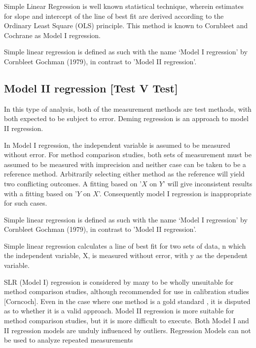 \documentclass[12pt, a4paper]{report}
\theoremstyle{plain}
\theoremstyle{definition}
\theoremstyle{remark}
\begin{document}
Simple Linear Regression is well known statistical technique, wherein estimates for slope and
intercept of the line of best fit are derived according to the Ordinary Least Square (OLS) principle. This method is known to Cornbleet and Cochrane as Model I regression.

Simple linear regression is defined as such with the name `Model I regression' by Cornbleet Gochman (1979), in contrast to 'Model II regression'.

 
\subsection{Model II regression [Test V Test]}
In this type of analysis, both of the measurement methods are test methods, with both expected to be subject to error. Deming regression is an approach to model II regression.



In Model I regression, the independent variable is assumed to be
measured without error. For method comparison studies, both sets of measurement must be assumed to be measured with imprecision and neither case can be taken to be a reference method. Arbitrarily
selecting either method as the reference will yield two conflicting outcomes. A fitting based on '$X$ on $Y$' will give inconsistent results with a fitting based on '$Y$ on $X$'. Consequently model I regression is inappropriate for such cases.



 Simple linear regression is defined as such with the name `Model I regression' by Cornbleet Gochman (1979), in contrast to 'Model II regression'.

Simple linear regression calculates a line of best fit for two
sets of data, n which the independent variable, X, is measured without error, with y as the dependent variable.  

SLR (Model I) regression is considered by many \citet{BA83,CornCoch,ludbrook97} to be wholly unsuitable for
method comparison studies, although recommended for use in calibration studies [Corncoch]. Even in the case where one
method is a gold standard , it is disputed as to whether it is a valid approach. Model II regression is more suitable for method comparison studies, but it is more difficult to execute. Both Model I and II regression models are unduly influenced by outliers. Regression Models can not be used to analyze repeated measurements
\end{document}
